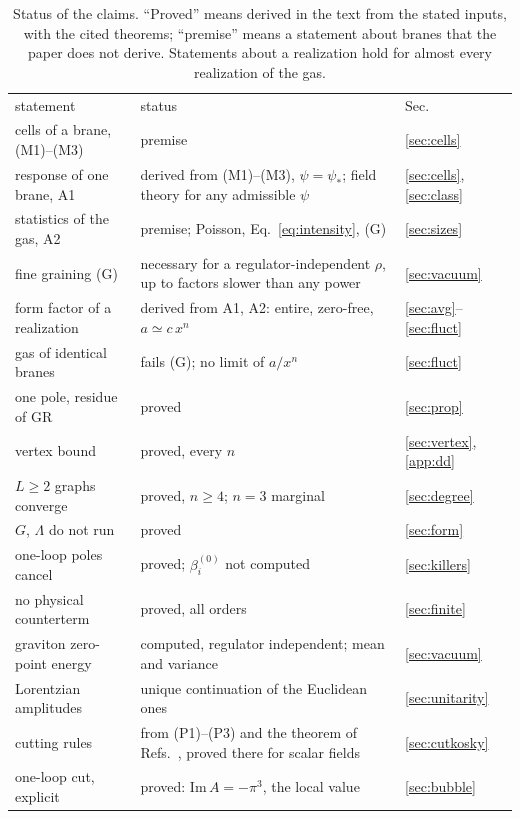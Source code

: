 \documentclass[aps,prd,10pt,twocolumn,superscriptaddress,nofootinbib,floatfix,longbibliography]{revtex4-2}
\begin{document}
\begin{table}[tp]
\caption{Status of the claims. ``Proved'' means derived in the text from the stated inputs, with the cited theorems; ``premise'' means a statement about branes that the paper does not derive. Statements about a realization hold for almost every realization of the gas.}
\label{tab:status}
\begin{ruledtabular}
\begin{tabular}{p{4.6cm}p{9.9cm}p{2.0cm}}
statement & status & Sec.\\
\colrule
cells of a brane, (M1)--(M3) & premise & \ref{sec:cells}\\
response of one brane, A1 & derived from (M1)--(M3), $\psi=\psi_*$; field theory for any admissible $\psi$ & \ref{sec:cells}, \ref{sec:class}\\
statistics of the gas, A2 & premise; Poisson, Eq.~\eqref{eq:intensity}, (G) & \ref{sec:sizes}\\
fine graining (G) & necessary for a regulator-independent $\rho$, up to factors slower than any power & \ref{sec:vacuum}\\
form factor of a realization & derived from A1, A2: entire, zero-free, $a\simeq c\,x^n$ & \ref{sec:avg}--\ref{sec:fluct}\\
gas of identical branes & fails (G); no limit of $a/x^n$ & \ref{sec:fluct}\\
one pole, residue of GR & proved & \ref{sec:prop}\\
vertex bound & proved, every $n$ & \ref{sec:vertex}, \ref{app:dd}\\
$L\ge2$ graphs converge & proved, $n\ge4$; $n=3$ marginal & \ref{sec:degree}\\
$G$, $\Lambda$ do not run & proved & \ref{sec:form}\\
one-loop poles cancel & proved; $\beta^{(0)}_i$ not computed & \ref{sec:killers}\\
no physical counterterm & proved, all orders & \ref{sec:finite}\\
graviton zero-point energy & computed, regulator independent; mean and variance & \ref{sec:vacuum}\\
Lorentzian amplitudes & unique continuation of the Euclidean ones & \ref{sec:unitarity}\\
cutting rules & from (P1)--(P3) and the theorem of Refs.~\cite{PiusSen2016,BrisceseModesto2019}, proved there for scalar fields & \ref{sec:cutkosky}\\
one-loop cut, explicit & proved: $\mathrm{Im}\,A=-\pi^3$, the local value & \ref{sec:bubble}\\

\end{tabular}
\end{ruledtabular}
\end{table}
\end{document}
